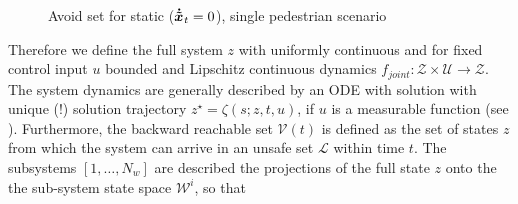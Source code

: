 \begin{figure}[!ht]
\begin{center}
\end{center}
\caption{Avoid set for static ($\dxped[]_t = 0$), single pedestrian scenario}
\label{img:hj_game_multiagent}
\end{figure}

Therefore we define the full system $z$ with uniformly continuous and for fixed control input $u$ bounded and Lipschitz continuous dynamics $f_{joint}: \mathcal{Z} \times \mathcal{U} \rightarrow \mathcal{Z}$. The system dynamics are generally described by an \ac{ODE} with solution with unique (!) solution trajectory $z^{\star} = \zeta(s; z, t, u)$, if $u$ is a measurable function (see \cite{Chen2016a}\cite{Varaiya1967}). Furthermore, the backward reachable set $\mathcal{V}(t)$ is defined as the set of states $z$ from which the system can arrive in an unsafe set $\mathcal{L}$ within time $t$. The subsystems $[1, \hdots, N_w]$ are described the projections of the full state $z$ onto the the sub-system state space $\mathcal{W}^i$, so that


